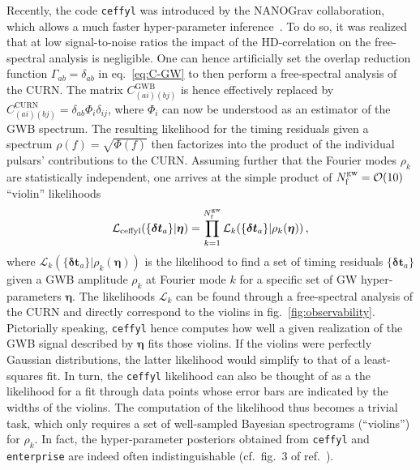 Recently, the code \texttt{ceffyl} was introduced by the \ac{NANOGrav} collaboration, which allows a much faster hyper-parameter inference~\cite{Lamb:2023jls}.  To do so, it was realized that at low signal-to-noise ratios the impact of the \ac{HD}-correlation on the free-spectral analysis is negligible. One can hence artificially set the overlap reduction function $\Gamma_{ab} = \delta_{ab}$ in eq.~\eqref{eq:C-GW} to then perform a free-spectral analysis of the \ac{CURN}. The matrix $C_{(ai)(bj)}^\text{GWB}$ is hence effectively replaced by $C_{(ai)(bj)}^\text{CURN} = \delta_{ab} \Phi_i \delta_{ij}$, where $\Phi_i $ can now be understood as an estimator of the \ac{GWB} spectrum. The resulting likelihood for the timing residuals given a spectrum $\rho(f) = \sqrt{\Phi(f)}$ then factorizes into the product of the individual pulsars' contributions to the \ac{CURN}. Assuming further that the Fourier modes $\rho_k$ are statistically independent, one arrives at the simple product of $N_\text{f}^{\text{gw}} = \mathcal{O}(10)$ ``violin'' likelihoods
\begin{align}
	\mathcal{L}_\text{ceffyl}(\{ \bm{\delta t}_a\}| \bm{\eta}) = \prod_{k = 1}^{N_\text{f}^{\text{gw}}} \mathcal{L}_k(\{ \bm{\delta t}_a\} | \rho_k(\bm{\eta})) \, , \label{eq:ceffyl}
\end{align}
where $ \mathcal{L}_k( \{ \bm{\delta t}_a\} | \rho_k(\bm{\eta}) )$ is the likelihood to find a set of timing residuals $ \{ \bm{\delta t}_a\}$ given a \ac{GWB} amplitude $\rho_k$ at Fourier mode $k$ for a specific set of \ac{GW} hyper-parameters $\bm{\eta}$. The likelihoods $\mathcal{L}_k$ can be found through a free-spectral analysis of the \ac{CURN} and directly correspond to the violins in fig.~\ref{fig:observability}.   Pictorially speaking, \texttt{ceffyl} hence computes how well a given realization of the \ac{GWB} signal described by $\bm{\eta}$ fits those violins. If the violins were perfectly Gaussian distributions, the latter likelihood would simplify to that of a least-squares fit. In turn, the \texttt{ceffyl} likelihood can also be thought of as a the likelihood for a fit through data points whose error bars are indicated by the widths of the violins. The computation of the likelihood thus becomes a trivial task, which only requires a set of well-sampled Bayesian spectrograms (``violins'') for $\rho_k$. In fact, the hyper-parameter posteriors obtained from \texttt{ceffyl} and \texttt{enterprise} are indeed often indistinguishable (cf.~fig.~3 of ref.~\cite{Lamb:2023jls}).

